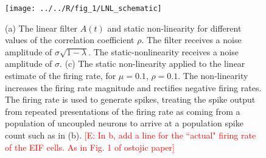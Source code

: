 \documentclass[%
 reprint,
 amsmath,amssymb,
 aps,
floatfix,
]{revtex4-1}
\newcommand{\Ecomment}[1]{\textcolor{red}{[E: #1]}}
\begin{document}
%
%
%
%


\begin{figure}[t!]
\texttt{[image: ../../R/fig\_1/LNL\_schematic]}
\caption{\label{fig:schematic2}  (a) The linear filter $A(t)$ and static non-linearity for different values of the correlation coefficient $\rho$. The filter receives a noise amplitude of $\sigma\sqrt{1-\lambda}$. The static-nonlinearity receives a noise amplitude of $\sigma$. (c) The static non-linearity applied to the linear estimate of the firing rate, for $\mu = 0.1$, $\rho = 0.1$. The non-linearity increases the firing rate magnitude and rectifies negative firing rates. The firing rate is used to generate spikes, treating the spike output from repeated presentations of the firing rate as coming from a population of uncoupled neurons to arrive at a population spike count such as in (b).  \Ecomment{In b, add a line for the ``actual" firing rate of the EIF cells. As in Fig. 1 of ostojic paper}}
\end{figure}
\end{document}
